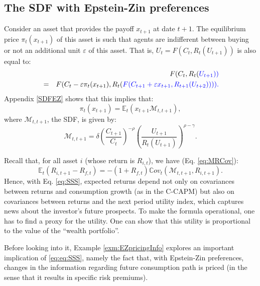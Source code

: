 \documentclass[
  12pt,
]{book}
\theoremstyle{definition}
\theoremstyle{definition}
\theoremstyle{definition}
\theoremstyle{definition}
\theoremstyle{remark}
\begin{document}
\hypertarget{the-sdf-with-epstein-zin-preferences}{%
\subsection{The SDF with Epstein-Zin preferences}\label{the-sdf-with-epstein-zin-preferences}}

Consider an asset that provides the payoff \(x_{t+1}\) at date \(t+1\).
The equilibrium price \(\pi_t(x_{t+1})\) of this asset is such that agents are indifferent between buying or not an additional unit \(\varepsilon\) of this asset.
That is, \(U_t = F(C_t,R_t(U_{t+1}))\) is also equal to:
\begin{eqnarray}
&&  F(C_t,R_t(\color{blue}{U_{t+1}})) \nonumber \\
&=&F(C_t-\varepsilon \pi_t(x_{t+1}),R_t(\color{blue}{F(C_{t+1}+\varepsilon x_{t+1},R_{t+1}(U_{t+2}))})).\label{eq:SDFV}
\end{eqnarray}
Appendix \ref{SDFEZ} shows that this implies that:
\[
\pi_t(x_{t+1}) = \mathbb{E}_t \left( x_{t+1} \mathcal{M}_{t,t+1} \right),
\]
where \(\mathcal{M}_{t,t+1}\), the SDF, is given by:
\begin{equation}
\mathcal{M}_{t,t+1}= \delta \left(\frac{C_{t+1}}{C_t}\right)^{-\rho}  \left(\frac{U_{t+1}}{R_{t}(U_{t+1})}\right)^{\rho-\gamma}.\label{eq:SSS}
\end{equation}

Recall that, for all asset \(i\) (whose return is \(R_{i,t}\)), we have (Eq. \eqref{eq:MRCov}):
\[
\mathbb{E}_t(R_{i,t+1} - R_{f,t}) = - (1 + R_{f,t}) \mathbb{C}ov_t(\mathcal{M}_{t,t+1},R_{i,t+1}).
\]
Hence, with Eq. \eqref{eq:SSS}, expected returns depend not only on covariances between returns and consumption growth (as in the C-CAPM) but also on covariances between returns and the next period utility index, which captures news about the investor's future prospects.
To make the formula operational, one has to find a proxy for the utility. One can show that this utility is proportional to the value of the ``wealth portfolio''.

Before looking into it, Example \ref{exm:EZpricingInfo} explores an important implication of \eqref{eq:eq:SSS}, namely the fact that, with Epstein-Zin preferences, changes in the information regarding future consumption path is priced (in the sense that it results in specific risk premiums).
\end{document}
